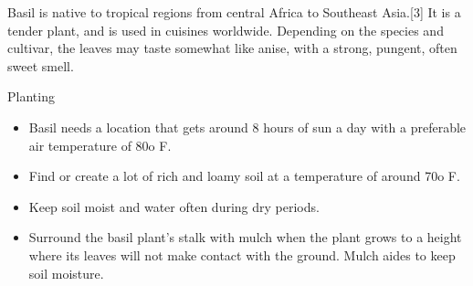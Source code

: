 \begin{definition} Basil is native to tropical regions from central
Africa to Southeast Asia.[3] It is a tender plant, and is used in
cuisines worldwide. Depending on the species and cultivar, the leaves
may taste somewhat like anise, with a strong, pungent, often sweet
smell.
\end{definition}

\begin{instruction}{Planting}
  \begin{itemize}
  \item Basil needs a location that gets around 8 hours of sun a day
with a preferable air temperature of 80o F.
  \item Find or create a lot of rich and loamy soil at a temperature
of around 70o F.
  \item Keep soil moist and water often during dry periods.
  \item Surround the basil plant’s stalk with mulch when the plant
grows to a height where its leaves will not make contact with the
ground. Mulch aides to keep soil moisture.
  \end{itemize}
\end{instruction}
